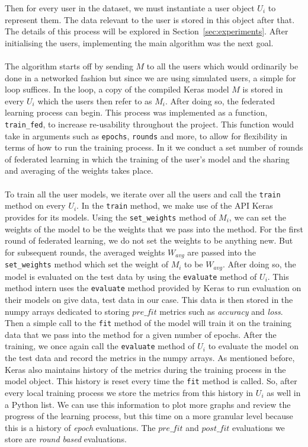 \documentclass[12pt]{article}
\begin{document}
\noindent Then for every user in the dataset, we must instantiate a user object $U_i$ to represent them. The data relevant to the user is stored in this object after that. The details of this process will be explored in Section~\ref{sec:experiments}. After initialising the users, implementing the main algorithm was the next goal. 
\\\\
The algorithm starts off by sending $M$ to all the users which would ordinarily be done in a networked fashion but since we are using simulated users, a simple for loop suffices. In the loop, a copy of the compiled Keras model $M$ is stored in every $U_i$ which the users then refer to as $M_i$. After doing so, the federated learning process can begin. This process was implemented as a function, \texttt{train\_fed}, to increase re-usability throughout the project. This function would take in arguments such as \texttt{epochs}, \texttt{rounds} and more, to allow for flexibility in terms of how to run the training process. In it we conduct a set number of rounds of federated learning in which the training of the user's model and the sharing and averaging of the weights takes place.
\\\\
To train all the user models, we iterate over all the users and call the \texttt{train} method on every $U_i$. In the \texttt{train} method, we make use of the API Keras provides for its models. Using the \texttt{set\_weights} method of $M_i$, we can set the weights of the model to be the weights that we pass into the method. For the first round of federated learning, we do not set the weights to be anything new. But for subsequent rounds, the averaged weights $W_{avg}$ are passed into the \texttt{set\_weights} method which set the weight of $M_i$ to be $W_{avg}$. After doing so, the model is evaluated on the test data by using the \texttt{evaluate} method of $U_i$. This method intern uses the \texttt{evaluate} method provided by Keras to run evaluation on their models on give data, test data in our case. This data is then stored in the numpy arrays dedicated to storing $pre\_fit$ metrics such as \textit{accuracy} and \textit{loss}. Then a simple call to the \texttt{fit} method of the model will train it on the training data that we pass into the method for a given number of epochs. After the training, we once again call the \texttt{evaluate} method of $U_i$ to evaluate the model on the test data and record the metrics in the numpy arrays. As mentioned before, Keras also maintains history of the metrics during the training process in the model object. This history is reset every time the \texttt{fit} method is called. So, after every local training process we store the metrics from this history in $U_i$ as well in a Python list. We can use this information to plot more graphs and review the progress of the learning process, but this time on a more granular level because this is a history of \textit{epoch} evaluations. The $pre\_fit$ and $post\_fit$ evaluations we store are \textit{round based} evaluations.
\end{document}
